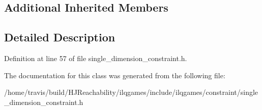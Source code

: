 \subsection*{Additional Inherited Members}


\subsection{Detailed Description}


Definition at line 57 of file single\+\_\+dimension\+\_\+constraint.\+h.



The documentation for this class was generated from the following file\+:\begin{DoxyCompactItemize}
\item 
/home/travis/build/\+H\+J\+Reachability/ilqgames/include/ilqgames/constraint/single\+\_\+dimension\+\_\+constraint.\+h\end{DoxyCompactItemize}
